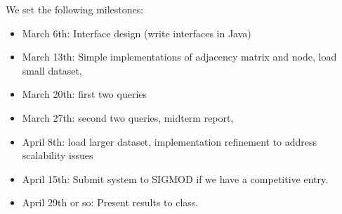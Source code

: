 \documentclass{article}
\begin{document}
We set the following milestones:

\begin{itemize}
\item March 6th: Interface design (write interfaces in Java)
\item March 13th: Simple implementations of adjacency matrix and node, load small dataset, 
\item March 20th: first two queries
\item March 27th: second two queries, midterm report,
\item April 8th: load larger dataset, implementation refinement to address scalability issues
\item April 15th: Submit system to SIGMOD if we have a competitive entry.
\item April 29th or so: Present results to class.
\end{itemize}
\end{document}
